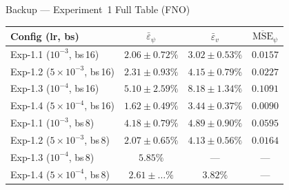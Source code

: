 \documentclass[aspectratio=169, 10pt]{beamer}
\begin{document}
\begin{frame}{Backup — Experiment~1 Full Table (FNO)}
  \begin{center}
  \small
  \begin{tabular}{lccc}
    \toprule
    \textbf{Config (lr, bs)} & $\bar{\varepsilon}_\psi$ & $\bar{\varepsilon}_v$ & $\overline{\text{MSE}}_\psi$ \\
    \midrule
    Exp-1.1 ($10^{-3}$, bs\,16)            & $2.06\pm0.72\%$ & $3.02\pm0.53\%$ & $0.0157$ \\
    Exp-1.2 ($5\!\times\!10^{-3}$, bs\,16) & $2.31\pm0.93\%$ & $4.15\pm0.79\%$ & $0.0227$ \\
    Exp-1.3 ($10^{-4}$, bs\,16)            & $5.10\pm2.59\%$ & $8.18\pm1.34\%$ & $0.1091$ \\
    Exp-1.4 ($5\!\times\!10^{-4}$, bs\,16) & $\mathbf{1.62\pm0.49\%}$ & $3.44\pm0.37\%$ & $\mathbf{0.0090}$ \\
    \midrule
    Exp-1.1 ($10^{-3}$, bs\,8)             & $4.18\pm0.79\%$ & $4.89\pm0.90\%$ & $0.0595$ \\
    Exp-1.2 ($5\!\times\!10^{-3}$, bs\,8)  & $\mathbf{2.07\pm0.65\%}$ & $4.13\pm0.56\%$ & $0.0164$ \\
    Exp-1.3 ($10^{-4}$, bs\,8)             & $5.85\%$ & — & — \\
    Exp-1.4 ($5\!\times\!10^{-4}$, bs\,8)  & $2.61\pm\ldots\%$ & $3.82\%$ & — \\
    \bottomrule
  \end{tabular}
  \end{center}
\end{frame}
\end{document}
